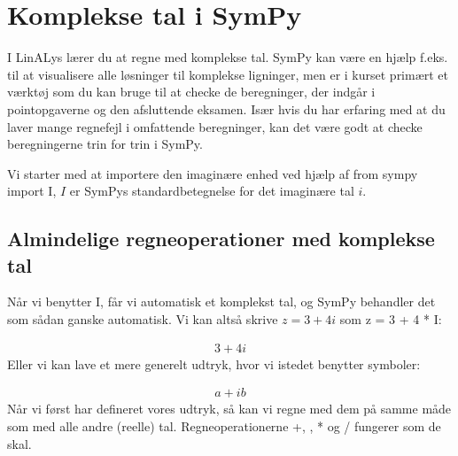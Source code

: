 \documentclass[letterpaper,10pt,english]{jupyterBook}
\begin{document}
\section{Komplekse tal i SymPy}
\label{\detokenize{notebooks/sympy/Notebook_kompleks:komplekse-tal-i-sympy}}\label{\detokenize{notebooks/sympy/Notebook_kompleks::doc}}
I LinALys lærer du at regne med komplekse tal. SymPy kan være en hjælp f.eks. til at visualisere alle løsninger til komplekse ligninger, men er i kurset primært et værktøj som du kan bruge til at checke de beregninger, der indgår i pointopgaverne og den afsluttende eksamen. Især hvis du har erfaring med at du laver mange regnefejl i omfattende beregninger, kan det være godt at checke beregningerne trin for trin i SymPy.

Vi starter med at importere den imaginære enhed ved hjælp af from sympy import I, \(I\) er SymPys standardbetegnelse for det imaginære tal \(i\).

\begin{sphinxVerbatim}[commandchars=\\\{\}]
   
    
\end{sphinxVerbatim}


\subsection{Almindelige regneoperationer med komplekse tal}
\label{\detokenize{notebooks/sympy/Notebook_kompleks:almindelige-regneoperationer-med-komplekse-tal}}
Når vi benytter I, får vi automatisk et komplekst tal, og SymPy behandler det som sådan ganske automatisk. Vi kan altså skrive \(z = 3 + 4i\) som z = 3 + 4 * I:

\begin{sphinxVerbatim}[commandchars=\\\{\}]
      
\end{sphinxVerbatim}
\begin{equation*}
\begin{split}\displaystyle 3 + 4 i\end{split}
\end{equation*}
Eller vi kan lave et mere generelt udtryk, hvor vi istedet benytter symboler:

\begin{sphinxVerbatim}[commandchars=\\\{\}]
    
      
\end{sphinxVerbatim}
\begin{equation*}
\begin{split}\displaystyle a + i b\end{split}
\end{equation*}
Når vi først har defineret vores udtryk, så kan vi regne med dem på samme måde som med alle andre (reelle) tal. Regneoperationerne +, \sphinxhyphen{}, * og / fungerer som de skal.
\end{document}
